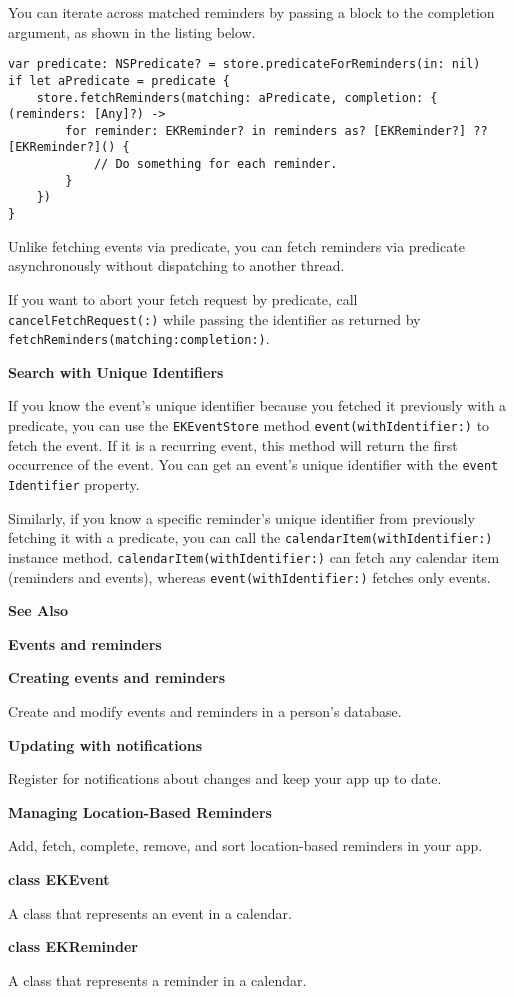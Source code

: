 \documentclass{article}
\begin{document}
You can iterate across matched reminders by passing a block to the completion argument, as shown in the listing below.

\begin{verbatim}
var predicate: NSPredicate? = store.predicateForReminders(in: nil)
if let aPredicate = predicate {
    store.fetchReminders(matching: aPredicate, completion: { (reminders: [Any]?) ->
        for reminder: EKReminder? in reminders as? [EKReminder?] ?? [EKReminder?]() {
            // Do something for each reminder.
        }
    })
}
\end{verbatim}

Unlike fetching events via predicate, you can fetch reminders via predicate asynchronously without dispatching to another thread.

If you want to abort your fetch request by predicate, call \texttt{cancelFetchRequest(:)} while passing the identifier as returned by \texttt{fetchReminders(matching:completion:)}.

\textbf{Search with Unique Identifiers}

If you know the event's unique identifier because you fetched it previously with a predicate, you can use the \texttt{EKEventStore} method \texttt{event(withIdentifier:)} to fetch the event. If it is a recurring event, this method will return the first occurrence of the event. You can get an event's unique identifier with the \texttt{event Identifier} property.

Similarly, if you know a specific reminder's unique identifier from previously fetching it with a predicate, you can call the \texttt{calendarItem(withIdentifier:)} instance method. \texttt{calendarItem(withIdentifier:)} can fetch any calendar item (reminders and events), whereas \texttt{event(withIdentifier:)} fetches only events.

\textbf{See Also}

\textbf{Events and reminders}

\textbf{Creating events and reminders}

Create and modify events and reminders in a person's database.

\textbf{Updating with notifications}

Register for notifications about changes and keep your app up to date.

\textbf{Managing Location-Based Reminders}

Add, fetch, complete, remove, and sort location-based reminders in your app.

\textbf{class EKEvent}

A class that represents an event in a calendar.

\textbf{class EKReminder}

A class that represents a reminder in a calendar.
\newpage
\end{document}
